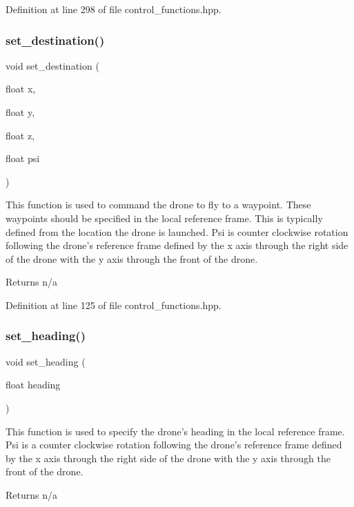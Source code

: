 Definition at line 298 of file control\+\_\+functions.\+hpp.

\mbox{\label{group__control__functions_gab90a45d8b081ba329b9d0f886adbc2d5}} 
\subsubsection{\texorpdfstring{set\_destination()}{set\_destination()}}
{\footnotesize\ttfamily void set\+\_\+destination (\begin{DoxyParamCaption}\item[{float}]{x,  }\item[{float}]{y,  }\item[{float}]{z,  }\item[{float}]{psi }\end{DoxyParamCaption})}

This function is used to command the drone to fly to a waypoint. These waypoints should be specified in the local reference frame. This is typically defined from the location the drone is launched. Psi is counter clockwise rotation following the drone’s reference frame defined by the x axis through the right side of the drone with the y axis through the front of the drone. \begin{DoxyReturn}{Returns}
n/a 
\end{DoxyReturn}


Definition at line 125 of file control\+\_\+functions.\+hpp.

\mbox{\label{group__control__functions_ga92292bc0da7dd2a58edf8e9aa10eb682}} 
\subsubsection{\texorpdfstring{set\_heading()}{set\_heading()}}
{\footnotesize\ttfamily void set\+\_\+heading (\begin{DoxyParamCaption}\item[{float}]{heading }\end{DoxyParamCaption})}

This function is used to specify the drone’s heading in the local reference frame. Psi is a counter clockwise rotation following the drone’s reference frame defined by the x axis through the right side of the drone with the y axis through the front of the drone. \begin{DoxyReturn}{Returns}
n/a 
\end{DoxyReturn}


